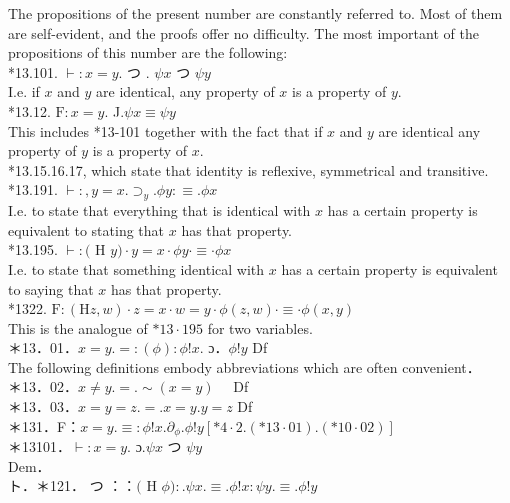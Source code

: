 \documentclass[10pt]{article}
\begin{document}
The propositions of the present number are constantly referred to. Most of them are self-evident, and the proofs offer no difficulty. The most important of the propositions of this number are the following:\\
*13.101. $\vdash: x=y$. つ . $\psi x$ つ $\psi y$\\
I.e. if $x$ and $y$ are identical, any property of $x$ is a property of $y$.\\
*13.12. $\mathrm{F}: x=y$. J.$\psi x \equiv \psi y$\\
This includes *13-101 together with the fact that if $x$ and $y$ are identical any property of $y$ is a property of $x$.\\
*13.15.16.17, which state that identity is reflexive, symmetrical and transitive.\\
*13.191. $\vdash:, y=x . \supset_{y} . \phi y: \equiv . \phi x$\\
I.e. to state that everything that is identical with $x$ has a certain property is equivalent to stating that $x$ has that property.\\
*13.195. $\vdash:($ H $y) \cdot y=x \cdot \phi y \cdot \equiv \cdot \phi x$\\
I.e. to state that something identical with $x$ has a certain property is equivalent to saying that $x$ has that property.\\
*1322. $\mathrm{F}:(\mathrm{H} z, w) \cdot z=x \cdot w=y \cdot \phi(z, w) \cdot \equiv \cdot \phi(x, y)$\\
This is the analogue of $* 13 \cdot 195$ for two variables.\\
＊13．01．$x=y .=:(\phi): \phi!x$. ɔ．$\phi!y$ Df\\
The following definitions embody abbreviations which are often convenient．\\
＊13．02．$x \neq y .=. \sim(x=y) \quad$ Df\\
＊13．03．$x=y=z .=. x=y . y=z$ Df\\
＊131．F：$x=y . \equiv: \phi!x . \partial_{\phi} . \phi!y[* 4 \cdot 2 .(* 13 \cdot 01) .(* 10 \cdot 02)]$\\
＊13101．$\vdash: x=y$. ɔ.$\psi x$ つ $\psi y$\\
Dem．\\
ト．＊121． つ ：：$($ H $\phi): . \psi x . \equiv . \phi!x: \psi y . \equiv . \phi!y$
\end{document}
